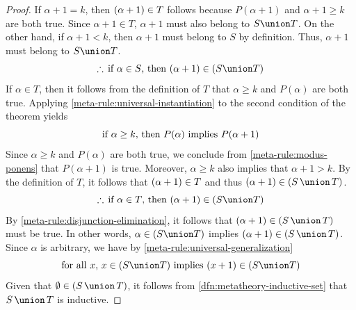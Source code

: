 \begin{proof}
    \vspace{0.3cm}
    \noindent
    If \( \alpha + 1 = k \), then \( \mleft( \alpha + 1 \mright) \in T \) follows because \( P(\alpha + 1) \) and \( \alpha + 1 \geq k \) are both true.
    Since \( \alpha + 1 \in T \), \( \alpha + 1 \) must also belong to \( S \union T \).
    On the other hand, if \( \alpha + 1 < k \), then \( \alpha + 1 \) must belong to \( S \) by definition.
    Thus, \( \alpha + 1 \) must belong to \( S \union T \).
    \begin{equation*}
        \therefore \, \text{if \( \alpha \in S \), then \( \mleft( \alpha + 1 \mright) \in \mleft( S \union T \mright) \)}
    \end{equation*}
    If \( \alpha \in T \), then it follows from the definition of \( T \) that \( \alpha \geq k \) and \( P(\alpha) \) are both true.
    Applying \cref{meta-rule:universal-instantiation} to the second condition of the theorem yields
    \begin{equation*}
        \text{if \( \alpha \geq k \), then \( P(\alpha) \) implies \( P(\alpha + 1) \)}
    \end{equation*}
    Since \( \alpha \geq k \) and \( P(\alpha) \) are both true, we conclude from \cref{meta-rule:modus-ponens} that \( P(\alpha + 1) \) is true.
    Moreover, \( \alpha \geq k \) also implies that \( \alpha + 1 > k \).
    By the definition of \( T \), it follows that \( \mleft( \alpha + 1 \mright) \in T \) and thus \( \mleft( \alpha + 1 \mright) \in \mleft( S \,{\union}\, T \mright) \).
    \begin{equation*}
        \therefore \, \text{if \( \alpha \in T \), then \( \mleft( \alpha + 1 \mright) \in \mleft( S \union T \mright) \)}
    \end{equation*}
    By \cref{meta-rule:disjunction-elimination}, it follows that \( \mleft( \alpha + 1 \mright) \in \mleft( S \,{\union}\, T \mright) \) must be true.
    In other words, \( \alpha \in \mleft( S \union T \mright) \) implies \( \mleft( \alpha + 1 \mright) \in \mleft( S \,{\union}\, T \mright) \).
    Since \( \alpha \) is arbitrary, we have by \cref{meta-rule:universal-generalization}
    \begin{equation*}
        \text{for all \( x \), \( x \in \mleft( S \union T \mright) \) implies \( \mleft( x + 1 \mright) \in \mleft( S \union T \mright) \)}
    \end{equation*}
    Given that \( \emptyset \in \mleft( S \,{\union}\, T \mright) \), it follows from \cref{dfn:metatheory-inductive-set} that \( S \,{\union}\, T \) is inductive.

\end{proof}
